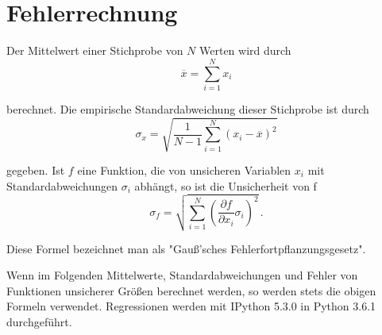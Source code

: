 \section{Fehlerrechnung}
\label{sec:Fehlerrechnung}
Der Mittelwert einer Stichprobe von $N$ Werten wird durch
\begin{equation}
  \overline{x} = \sum\limits_{i = 1}^N x_i
  \label{eqn:mean}
\end{equation}

berechnet.
Die empirische Standardabweichung dieser Stichprobe ist durch
\begin{equation}
  \sigma_x = \sqrt{\frac{1}{N-1}
    \sum\limits_{i = 1}^N
    (x_i-\overline{x})^2}
    \label{eqn:std}
\end{equation}

gegeben.
Ist $f$ eine Funktion, die von unsicheren Variablen $x_i$ mit
Standardabweichungen $\sigma_i$ abhängt, so ist die Unsicherheit von f
\begin{equation}
  \sigma_f = \sqrt{
    \sum\limits_{i = 1}^N
      \left( \frac{\partial f}{\partial x_i} \sigma_i \right)^{\!\! 2}
  }\,.
  \label{eqn:gaussfehler}
\end{equation}

Diese Formel bezeichnet man als "Gauß'sches Fehlerfortpflanzungsgesetz".

Wenn im Folgenden Mittelwerte, Standardabweichungen und Fehler von
Funktionen unsicherer Größen berechnet werden, so werden stets die obigen
Formeln verwendet. Regressionen werden mit IPython 5.3.0 in Python 3.6.1
durchgeführt.
